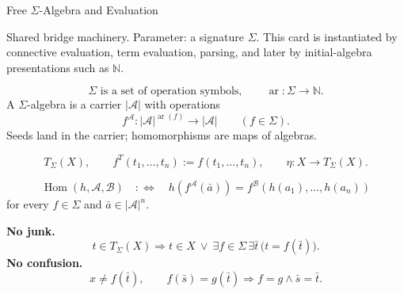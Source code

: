 \begin{modelbox}{Free \(\Sigma\)-Algebra and Evaluation}

\begin{modelparameterblock}
Shared bridge machinery. Parameter: a signature \(\Sigma\). This card is
instantiated by connective evaluation, term evaluation, parsing, and later by
initial-algebra presentations such as \(\mathbb N\).
\end{modelparameterblock}

\begin{modelstructureblock}
\[
  \Sigma\text{ is a set of operation symbols},
  \qquad
  \operatorname{ar}:\Sigma\to\mathbb N.
\]
A \(\Sigma\)-algebra is a carrier \(\lvert\mathcal A\rvert\) with operations
\[
  f^{\mathcal A}:\lvert\mathcal A\rvert^{\operatorname{ar}(f)}
  \to \lvert\mathcal A\rvert
  \qquad(f\in\Sigma).
\]
Seeds land in the carrier; homomorphisms are maps of algebras.
\end{modelstructureblock}

\begin{modelstructureblock}
\[
  T_{\Sigma}(X),
  \qquad
  f^{T}(t_1,\ldots,t_n):=f(t_1,\ldots,t_n),
  \qquad
  \eta:X\to T_{\Sigma}(X).
\]
\end{modelstructureblock}

\begin{modelsemanticbridgeblock}
\[
  \operatorname{Hom}(h,\mathcal A,\mathcal B)
  \quad:\Longleftrightarrow\quad
  h(f^{\mathcal A}(\bar a))
  =
  f^{\mathcal B}(h(a_1),\ldots,h(a_n))
\]
for every \(f\in\Sigma\) and \(\bar a\in\lvert\mathcal A\rvert^n\).
\end{modelsemanticbridgeblock}

\begin{modelaxiomsblock}
\textbf{No junk.}
\[
  t\in T_{\Sigma}(X)
  \Longrightarrow
  t\in X\ \vee\
  \exists f\in\Sigma\,\exists\bar t\,\bigl(t=f(\bar t)\bigr).
\]
\textbf{No confusion.}
\[
  x\neq f(\bar t),
  \qquad
  f(\bar s)=g(\bar t)\Longrightarrow f=g\wedge \bar s=\bar t.
\]
\end{modelaxiomsblock}

\begin{modelconsequences}
  \modelconsequence{\[
    \operatorname{eval}(\mathcal A)(\sigma):=\widehat\sigma.
  \]}
\end{modelconsequences}


\end{modelbox}
